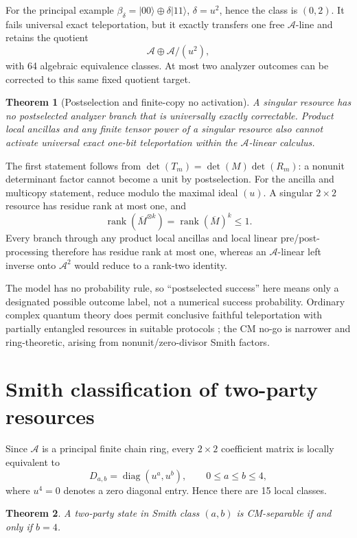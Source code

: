 \documentclass[11pt]{article}
\newtheorem{theorem}{Theorem}
\newcommand{\A}{\mathcal A}
\newcommand{\xorp}{\mathbin{\oplus}}
\newcommand{\ket}[1]{\lvert #1\rangle}
\begin{document}
For the principal example $\beta_\delta=\ket{00}\xorp\delta\ket{11}$,
$\delta=u^2$, hence the class is $(0,2)$.  It fails universal exact
teleportation, but it exactly transfers one free $\A$-line and retains the
quotient
\[
\A\oplus\A/(u^2),
\]
with 64 algebraic equivalence classes.  At most two analyzer outcomes can be
corrected to this same fixed quotient target.

\begin{theorem}[Postselection and finite-copy no activation]
A singular resource has no postselected analyzer branch that is universally
exactly correctable.  Product local ancillas and any finite tensor power of a
singular resource also cannot activate universal exact one-bit teleportation
within the $\A$-linear calculus.
\end{theorem}

The first statement follows from
$\det(T_m)=\det(M)\det(R_m)$: a nonunit determinant factor cannot become a
unit by postselection.  For the ancilla and multicopy statement, reduce modulo
the maximal ideal $(u)$.  A singular $2\times2$ resource has residue rank at
most one, and
\[
\operatorname{rank}(\overline{M}^{\otimes k})
=\operatorname{rank}(\overline{M})^k\le1.
\]
Every branch through any product local ancillas and local linear
pre/post-processing therefore has residue rank at most one, whereas an
$\A$-linear left inverse onto $\A^2$ would reduce to a rank-two identity.

The model has no probability rule, so ``postselected success'' here means only
a designated possible outcome label, not a numerical success probability.
Ordinary complex quantum theory does permit conclusive faithful teleportation
with partially entangled resources in suitable protocols
\cite{SonLeeKimPark2001Conclusive,RoaDelgadoFuentesGuridi2003}; the CM no-go is
narrower and ring-theoretic, arising from nonunit/zero-divisor Smith factors.

\section{Smith classification of two-party resources}

Since $\A$ is a principal finite chain ring, every $2\times2$ coefficient
matrix is locally equivalent to
\[
D_{a,b}=\operatorname{diag}(u^a,u^b),\qquad 0\le a\le b\le4,
\]
where $u^4=0$ denotes a zero diagonal entry.  Hence there are 15 local
classes.

\begin{theorem}
A two-party state in Smith class $(a,b)$ is CM-separable if and only if
$b=4$.
\end{theorem}
\end{document}
